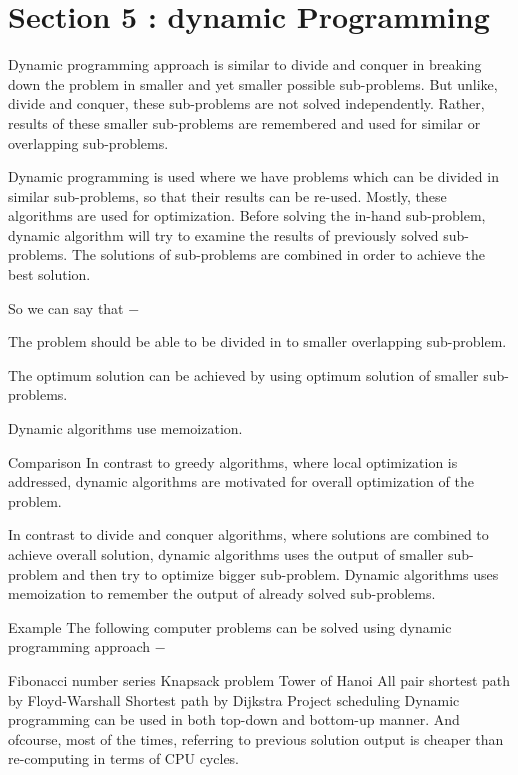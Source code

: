 \documentclass{beamer}
\begin{document}
\section{Section 5 : dynamic Programming}
\begin{frame}

Dynamic programming approach is similar to divide and conquer in breaking down the problem in smaller and yet smaller possible sub-problems. But unlike, divide and conquer, these sub-problems are not solved independently. Rather, results of these smaller sub-problems are remembered and used for similar or overlapping sub-problems.
\end{frame}
\begin{frame}
Dynamic programming is used where we have problems which can be divided in similar sub-problems, so that their results can be re-used. Mostly, these algorithms are used for optimization. Before solving the in-hand sub-problem, dynamic algorithm will try to examine the results of previously solved sub-problems. The solutions of sub-problems are combined in order to achieve the best solution.

So we can say that −

The problem should be able to be divided in to smaller overlapping sub-problem.

The optimum solution can be achieved by using optimum solution of smaller sub-problems.
\end{frame}
\begin{frame}
Dynamic algorithms use memoization.

Comparison
In contrast to greedy algorithms, where local optimization is addressed, dynamic algorithms are motivated for overall optimization of the problem.

In contrast to divide and conquer algorithms, where solutions are combined to achieve overall solution, dynamic algorithms uses the output of smaller sub-problem and then try to optimize bigger sub-problem. Dynamic algorithms uses memoization to remember the output of already solved sub-problems.
\end{frame}
\begin{frame}
Example
The following computer problems can be solved using dynamic programming approach −

Fibonacci number series
Knapsack problem
Tower of Hanoi
All pair shortest path by Floyd-Warshall
Shortest path by Dijkstra
Project scheduling
Dynamic programming can be used in both top-down and bottom-up manner. And ofcourse, most of the times, referring to previous solution output is cheaper than re-computing in terms of CPU cycles.
 
\end{frame}
\end{document}
